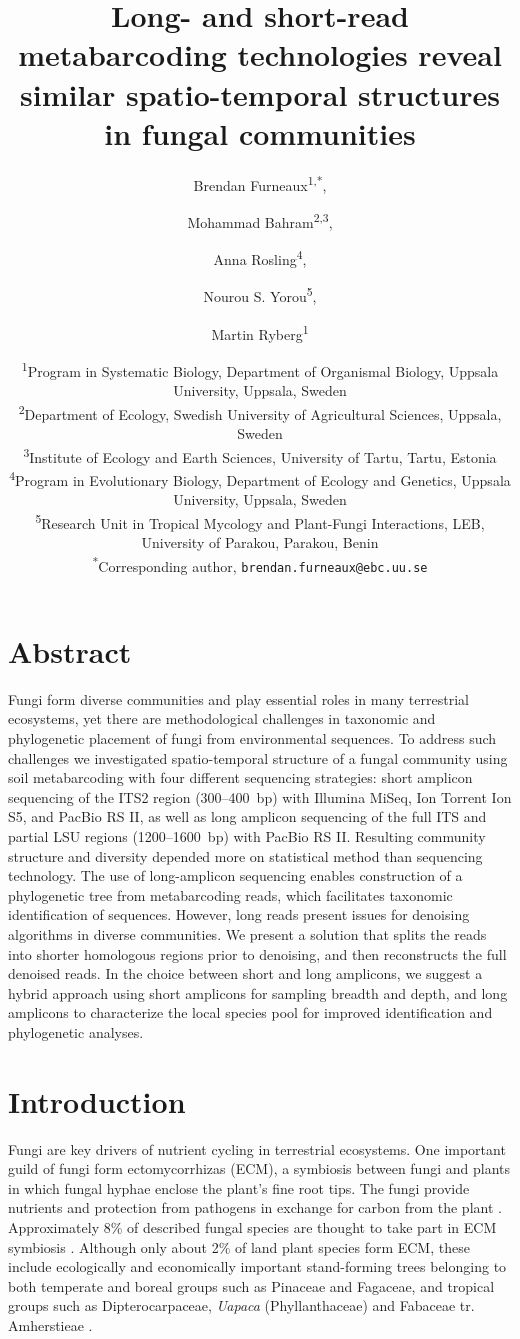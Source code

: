 \documentclass[
  12pt,
]{article}
\title{Long- and short-read metabarcoding technologies reveal similar spatio-temporal structures in fungal communities}
\author{Brendan Furneaux\textsuperscript{1,*}, \and Mohammad Bahram\textsuperscript{2,3}, \and Anna Rosling\textsuperscript{4}, \and Nourou S. Yorou\textsuperscript{5}, \and Martin Ryberg\textsuperscript{1}}
\date{\textsuperscript{1}Program in Systematic Biology, Department of Organismal Biology, Uppsala University, Uppsala, Sweden\\
\textsuperscript{2}Department of Ecology, Swedish University of Agricultural Sciences, Uppsala, Sweden\\
\textsuperscript{3}Institute of Ecology and Earth Sciences, University of Tartu, Tartu, Estonia\\
\textsuperscript{4}Program in Evolutionary Biology, Department of Ecology and Genetics, Uppsala University, Uppsala, Sweden\\
\textsuperscript{5}Research Unit in Tropical Mycology and Plant-Fungi Interactions, LEB, University of Parakou, Parakou, Benin\\
\textsuperscript{*}Corresponding author, \texttt{brendan.furneaux@ebc.uu.se}}
\begin{document}
\maketitle

\hypertarget{abstract}{%
\section*{Abstract}\label{abstract}}

Fungi form diverse communities and play essential roles in many terrestrial ecosystems, yet there are methodological challenges in taxonomic and phylogenetic placement of fungi from environmental sequences.
To address such challenges we investigated spatio-temporal structure of a fungal community using soil metabarcoding with four different sequencing strategies: short amplicon sequencing of the ITS2 region (300--400~bp) with Illumina MiSeq, Ion Torrent Ion S5, and PacBio RS II, as well as long amplicon sequencing of the full ITS and partial LSU regions (1200--1600~bp) with PacBio RS II.
Resulting community structure and diversity depended more on statistical method than sequencing technology.
The use of long-amplicon sequencing enables construction of a phylogenetic tree from metabarcoding reads, which facilitates taxonomic identification of sequences.
However, long reads present issues for denoising algorithms in diverse communities.
We present a solution that splits the reads into shorter homologous regions prior to denoising, and then reconstructs the full denoised reads.
In the choice between short and long amplicons, we suggest a hybrid approach using short amplicons for sampling breadth and depth, and long amplicons to characterize the local species pool for improved identification and phylogenetic analyses.

\hypertarget{introduction}{%
\section{Introduction}\label{introduction}}

Fungi are key drivers of nutrient cycling in terrestrial ecosystems.
One important guild of fungi form ectomycorrhizas (ECM), a symbiosis between fungi and plants in which fungal hyphae enclose the plant's fine root tips.
The fungi provide nutrients and protection from pathogens in exchange for carbon from the plant \autocite{Smith2010}.
Approximately 8\% of described fungal species are thought to take part in ECM symbiosis \autocite{ainsworth2008ainsworth,Rinaldi2008}.
Although only about 2\% of land plant species form ECM, these include ecologically and economically important stand-forming trees belonging to both temperate and boreal groups such as Pinaceae and Fagaceae, and tropical groups such as Dipterocarpaceae, \emph{Uapaca} (Phyllanthaceae) and Fabaceae tr. Amherstieae \autocite{brundrett2017a}.
\end{document}
